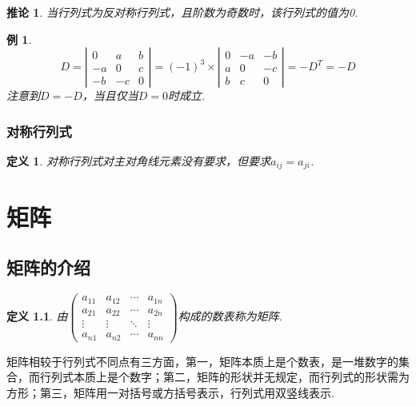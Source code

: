 \documentclass[12pt, a4paper, oneside]{ctexbook}
\newtheorem{definition}[theorem]{定义}
\newtheorem{corollary}[theorem]{推论}
\newtheorem{example}[theorem]{例}
\begin{document}
\begin{corollary}
    当行列式为反对称行列式，且阶数为奇数时，该行列式的值为0. 
\end{corollary}

\begin{example}
    $$D=\left | \begin{matrix}
        0  & a  & b \\
        -a & 0  & c \\
        -b & -c & 0
    \end{matrix} \right | = (-1)^3 \times \left | \begin{matrix}
        0 & -a & -b \\
        a & 0  & -c \\
        b & c  & 0
    \end{matrix} \right | = -D^T = -D$$
    注意到$D=-D$，当且仅当$D=0$时成立. 
\end{example}


\subsection{对称行列式}
\begin{definition}
    对称行列式对主对角线元素没有要求，但要求$a_{ij} = a_{ji}$. 
\end{definition}

\chapter{矩阵}
\section{矩阵的介绍}

\begin{definition}
    由$\left ( \begin{matrix}
        a_{11} & a_{12} & \cdots & a_{1n} \\
        a_{21} & a_{22} & \cdots & a_{2n} \\
        \vdots & \vdots & \ddots & \vdots \\
        a_{n1} & a_{n2} & \cdots & a_{nn}
    \end{matrix} \right )$构成的数表称为矩阵. 
\end{definition}

矩阵相较于行列式不同点有三方面，第一，矩阵本质上是个数表，是一堆数字的集合，而行列式本质上是个数字；第二，矩阵的形状并无规定，而行列式的形状需为方形；第三，矩阵用一对括号或方括号表示，行列式用双竖线表示. 
\end{document}
